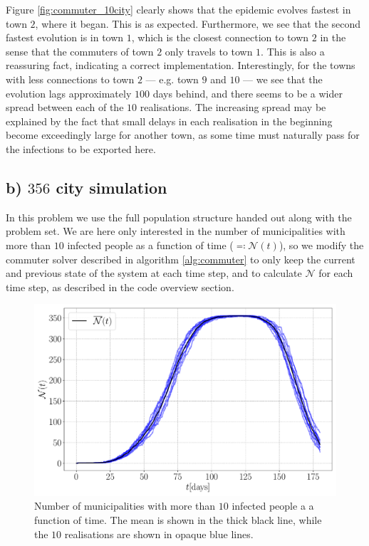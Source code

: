Figure \ref{fig:commuter_10city} clearly shows that the epidemic evolves fastest in town $2$, where it began. This is as expected. Furthermore, we see that the second fastest evolution is in town $1$, which is the closest connection to town $2$ in the sense that the commuters of town $2$ only travels to town $1$. This is also a reassuring fact, indicating a correct implementation. Interestingly, for the towns with less connections to town $2$ --- e.g. town $9$ and $10$ --- we see that the evolution lags approximately $100$ days behind, and there seems to be a wider spread between each of the $10$ realisations. The increasing spread may be explained by the fact that small delays in each realisation in the beginning become exceedingly large for another town, as some time must naturally pass for the infections to be exported here.

\subsection{b) $356$ city simulation}

In this problem we use the full population structure handed out along with the problem set. We are here only interested in the number of municipalities with more than $10$ infected people as a function of time ($\eqqcolon \mathcal{N}(t)$), so we modify the commuter solver described in algorithm \ref{alg:commuter} to only keep the current and previous state of the system at each time step, and to calculate $\mathcal{N}$ for each time step, as described in the code overview section. 

\begin{figure}[htb]
	\centering
	\includegraphics[width=0.9\columnwidth]{../fig/2Eb_N.pdf}
	\caption{Number of municipalities with more than $10$ infected people a a function of time. The mean is shown in the thick black line, while the $10$ realisations are shown in opaque blue lines.}
	\label{fig:infected_Eb}
\end{figure}

